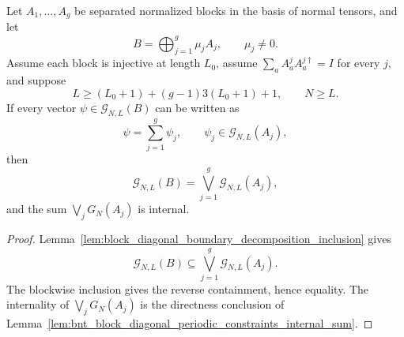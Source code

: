 \begin{lemma}
    \label{lem:bnt_block_diagonal_boundary_decomposition_equality}
    \leanok
    Let $A_1,\ldots,A_g$ be separated normalized blocks in the basis of normal
    tensors, and let
    \[
        B=\bigoplus_{j=1}^g\mu_jA_j,
        \qquad \mu_j\ne0.
    \]
    Assume each block is injective at length $L_0$, assume
    $\sum_aA^j_aA^{j\dagger}_a=I$ for every $j$, and suppose
    \[
        L\ge (L_0+1)+(g-1)3(L_0+1)+1,
        \qquad
        N\ge L.
    \]
    If every vector $\psi\in\mathcal G_{N,L}(B)$ can be written as
    \[
        \psi=\sum_{j=1}^g\psi_j,
        \qquad
        \psi_j\in\mathcal G_{N,L}(A_j),
    \]
    then
    \[
        \mathcal G_{N,L}(B)
        =
        \bigvee_{j=1}^g\mathcal G_{N,L}(A_j),
    \]
    and the sum $\bigvee_jG_N(A_j)$ is internal.
\end{lemma}

\begin{proof}
    \leanok
    Lemma~\ref{lem:block_diagonal_boundary_decomposition_inclusion} gives
    \[
        \mathcal G_{N,L}(B)
        \subseteq
        \bigvee_{j=1}^g\mathcal G_{N,L}(A_j).
    \]
    The blockwise inclusion gives the reverse containment, hence equality. The
    internality of $\bigvee_jG_N(A_j)$ is the directness conclusion of
    Lemma~\ref{lem:bnt_block_diagonal_periodic_constraints_internal_sum}.
\end{proof}
